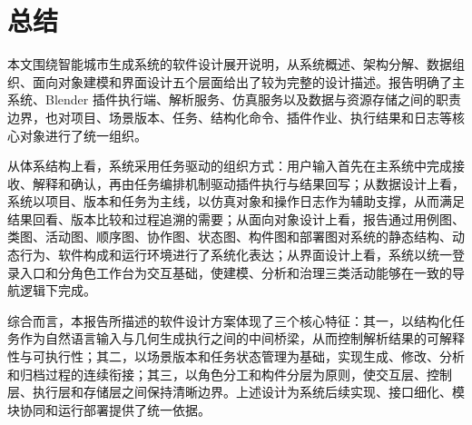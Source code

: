 \section{总结}
本文围绕智能城市生成系统的软件设计展开说明，从系统概述、架构分解、数据组织、面向对象建模和界面设计五个层面给出了较为完整的设计描述。报告明确了主系统、Blender 插件执行端、解析服务、仿真服务以及数据与资源存储之间的职责边界，也对项目、场景版本、任务、结构化命令、插件作业、执行结果和日志等核心对象进行了统一组织。

从体系结构上看，系统采用任务驱动的组织方式：用户输入首先在主系统中完成接收、解释和确认，再由任务编排机制驱动插件执行与结果回写；从数据设计上看，系统以项目、版本和任务为主线，以仿真对象和操作日志作为辅助支撑，从而满足结果回看、版本比较和过程追溯的需要；从面向对象设计上看，报告通过用例图、类图、活动图、顺序图、协作图、状态图、构件图和部署图对系统的静态结构、动态行为、软件构成和运行环境进行了系统化表达；从界面设计上看，系统以统一登录入口和分角色工作台为交互基础，使建模、分析和治理三类活动能够在一致的导航逻辑下完成。

综合而言，本报告所描述的软件设计方案体现了三个核心特征：其一，以结构化任务作为自然语言输入与几何生成执行之间的中间桥梁，从而控制解析结果的可解释性与可执行性；其二，以场景版本和任务状态管理为基础，实现生成、修改、分析和归档过程的连续衔接；其三，以角色分工和构件分层为原则，使交互层、控制层、执行层和存储层之间保持清晰边界。上述设计为系统后续实现、接口细化、模块协同和运行部署提供了统一依据。
